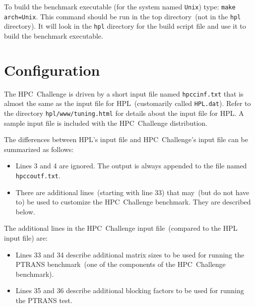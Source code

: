 \documentclass[twocolumn]{article}
\begin{document}
To build the benchmark executable (for the system named \texttt{Unix})
type: \texttt{make arch=Unix}.  This command should be run in the top
directory~(not in the \texttt{hpl} directory). It will look in the
\texttt{hpl} directory for the build script file and use it to build
the benchmark executable.

\section{Configuration}
The HPC~Challenge is driven by a short input file named
\texttt{hpccinf.txt} that is almost the same as the input file for
HPL~(customarily called \texttt{HPL.dat}). Refer to the directory
\texttt{hpl/www/tuning.html} for details about the input file for
HPL. A sample input file is included with the HPC~Challenge
distribution.

The differences between HPL's input file and HPC~Challenge's input
file can be summarized as follows:

\begin{itemize}
\item Lines 3 and 4 are ignored. The output is always appended to the
file named \texttt{hpccoutf.txt}.
\item There are additional lines~(starting with line 33) that may~(but
do not have to) be used to customize the HPC~Challenge benchmark. They
are described below.
\end{itemize}

The additional lines in the HPC~Challenge input file~(compared to the
HPL input file) are:

\begin{itemize}
\item Lines 33 and 34 describe additional matrix sizes to be used for
running the PTRANS benchmark~(one of the components of the
HPC~Challenge benchmark).
\item Lines 35 and 36 describe additional blocking factors to be used
for running the PTRANS test.
\end{itemize}
\end{document}
